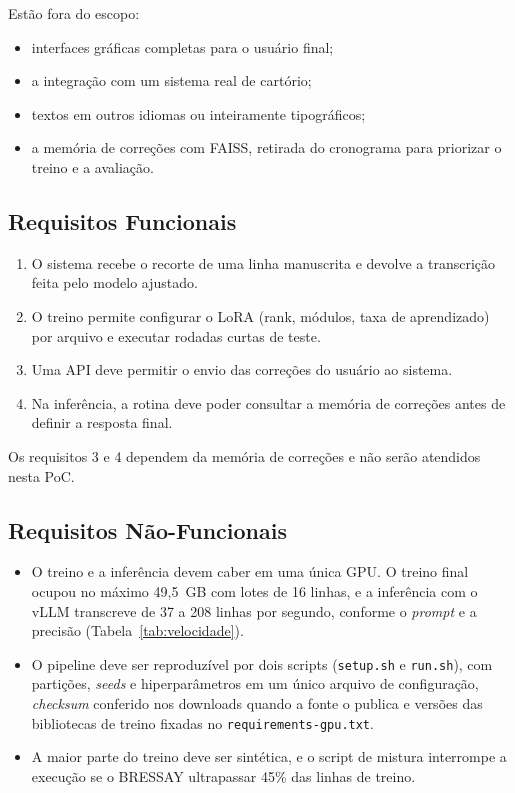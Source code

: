 \documentclass[12pt,a4paper]{article}
\begin{document}
Estão fora do escopo:
\begin{itemize}
    \item interfaces gráficas completas para o usuário final;
    \item a integração com um sistema real de cartório;
    \item textos em outros idiomas ou inteiramente tipográficos;
    \item a memória de correções com FAISS, retirada do cronograma para priorizar o treino e a avaliação.
\end{itemize}

\subsection{Requisitos Funcionais}

\begin{enumerate}
    \item O sistema recebe o recorte de uma linha manuscrita e devolve a transcrição feita pelo modelo ajustado.
    \item O treino permite configurar o LoRA (rank, módulos, taxa de aprendizado) por arquivo e executar rodadas curtas de teste.
    \item Uma API deve permitir o envio das correções do usuário ao sistema.
    \item Na inferência, a rotina deve poder consultar a memória de correções antes de definir a resposta final.
\end{enumerate}
Os requisitos 3 e 4 dependem da memória de correções e não serão atendidos nesta PoC.

\subsection{Requisitos Não-Funcionais}

\begin{itemize}
    \item O treino e a inferência devem caber em uma única GPU. O treino final ocupou no máximo 49,5~GB com lotes de 16 linhas, e a inferência com o vLLM \cite{vllm2023} transcreve de 37 a 208 linhas por segundo, conforme o \emph{prompt} e a precisão (Tabela~\ref{tab:velocidade}).
    \item O pipeline deve ser reproduzível por dois scripts (\texttt{setup.sh} e \texttt{run.sh}), com partições, \emph{seeds} e hiperparâmetros em um único arquivo de configuração, \emph{checksum} conferido nos downloads quando a fonte o publica e versões das bibliotecas de treino fixadas no \texttt{requirements-gpu.txt}.
    \item A maior parte do treino deve ser sintética, e o script de mistura interrompe a execução se o BRESSAY ultrapassar 45\% das linhas de treino.
\end{itemize}
\end{document}
